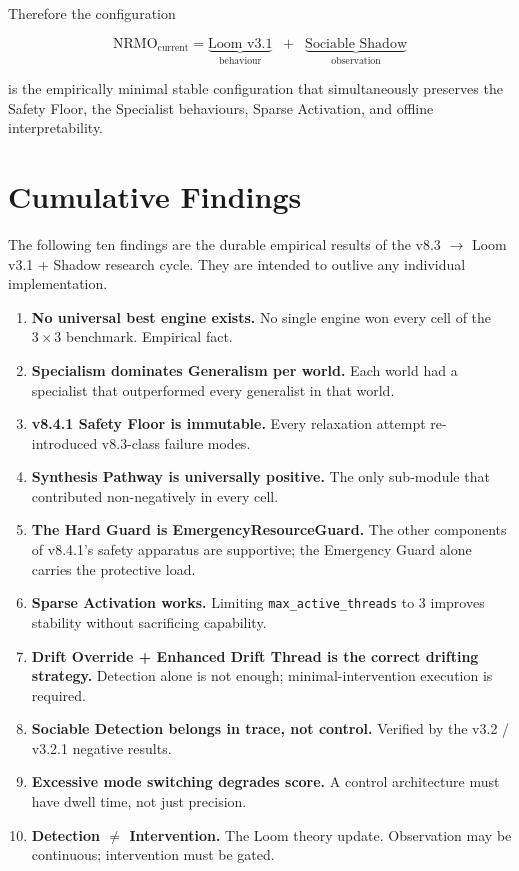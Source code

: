 Therefore the configuration

\begin{equation}
\text{NRMO}_{\text{current}}
  = \underbrace{\text{Loom v3.1}}_{\text{behaviour}}
  \;\;+\;\;
  \underbrace{\text{Sociable Shadow}}_{\text{observation}}
\end{equation}

is the empirically minimal stable configuration that simultaneously
preserves the Safety Floor, the Specialist behaviours, Sparse
Activation, and offline interpretability.

\chapter{Cumulative Findings}
\label{ch:cumulative_findings}

The following ten findings are the durable empirical results of the
v8.3 $\rightarrow$ Loom v3.1 + Shadow research cycle. They are
intended to outlive any individual implementation.

\begin{enumerate}
  \item \textbf{No universal best engine exists.} No single engine
    won every cell of the $3 \times 3$ benchmark. Empirical fact.
  \item \textbf{Specialism dominates Generalism per world.} Each
    world had a specialist that outperformed every generalist
    in that world.
  \item \textbf{v8.4.1 Safety Floor is immutable.} Every relaxation
    attempt re-introduced v8.3-class failure modes.
  \item \textbf{Synthesis Pathway is universally positive.} The
    only sub-module that contributed non-negatively in every cell.
  \item \textbf{The Hard Guard is EmergencyResourceGuard.} The other
    components of v8.4.1's safety apparatus are supportive; the
    Emergency Guard alone carries the protective load.
  \item \textbf{Sparse Activation works.} Limiting
    \texttt{max\_active\_threads} to 3 improves stability without
    sacrificing capability.
  \item \textbf{Drift Override + Enhanced Drift Thread is the
    correct drifting strategy.} Detection alone is not enough;
    minimal-intervention execution is required.
  \item \textbf{Sociable Detection belongs in trace, not control.}
    Verified by the v3.2 / v3.2.1 negative results.
  \item \textbf{Excessive mode switching degrades score.} A control
    architecture must have dwell time, not just precision.
  \item \textbf{Detection $\neq$ Intervention.} The Loom theory
    update. Observation may be continuous; intervention must be
    gated.
\end{enumerate}

